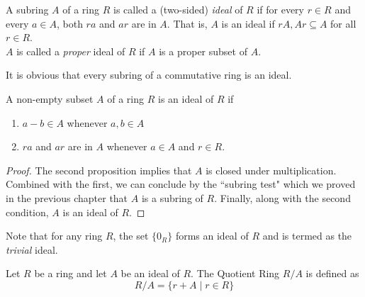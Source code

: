 \begin{definition}[Ideal]
	A subring $A$ of a ring $R$ is called a (two-sided) \textit{ideal} of $R$ if for every $r\in R$ and every $a\in A$, both $ra$ and $ar$ are in $A$. That is, $A$ is an ideal if $rA,Ar\subseteq A$ for all $r\in R$.\\
	$A$ is called a \textit{proper} ideal of $R$ if $A$ is a proper subset of $A$.
\end{definition}
It is obvious that every subring of a commutative ring is an ideal.

\begin{proposition}
	A non-empty subset $A$ of a ring $R$ is an ideal of $R$ if 
	\begin{enumerate}
		\item $a-b\in A$ whenever $a,b\in A$
		\item $ra$ and $ar$ are in $A$ whenever $a\in A$ and $r\in R$.
	\end{enumerate}
\end{proposition}
\begin{proof}
	The second proposition implies that $A$ is closed under multiplication. Combined with the first, we can conclude by the ``subring test" which we proved in the previous chapter that $A$ is a subring of $R$. Finally, along with the second condition, $A$ is an ideal of $R$.
\end{proof}

Note that for any ring $R$, the set $\{0_R\}$ forms an ideal of $R$ and is termed as the \textit{trivial} ideal.

\begin{definition}
	Let $R$ be a ring and let $A$ be an ideal of $R$. The Quotient Ring $R/A$ is defined as 
	$$
	R/A = \{r+A\mid r\in R\}
	$$
\end{definition}

